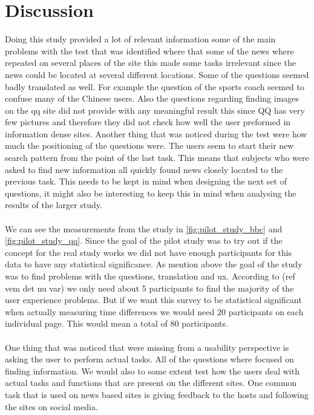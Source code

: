 \section{Discussion}
Doing this study provided a lot of relevant information some of the main problems with the test that was identified where that some of the news where repeated on several places of the site this made some tasks irrelevant since the news could be located at several different locations. Some of the questions seemed badly translated as well. For example the question of the sports coach seemed to confuse many of the Chinese users. Also the questions regarding finding images on the qq site did not provide with any meaningful result this since QQ has very few pictures and therefore they did not check how well the user preformed in information dense sites. Another thing that was noticed during the test were how much the positioning of the questions were. The users seem to start their new search pattern from the point of the last task. This means that subjects who were asked to find new information all quickly found news closely located to the previous task. This needs to be kept in mind when designing the next set of questions, it might also be interesting to keep this in mind when analysing the results of the larger study.
\\\\
We can see the measurements from the study in \ref{fig:pilot_study_bbc} and \ref{fig:pilot_study_qq}. Since the goal of the pilot study was to try out if the concept for the real study works we did not have enough participants for this data to have any statistical significance. As mention above the goal of the study was to find problems with the questions, translation and ux. According to (ref vem det nu var) we only need about 5 participants to find the majority of the user experience problems. But if we want this survey to be statistical significant when actually measuring time differences we would need 20 participants on each individual page. This would mean a total of 80 participants.
\\\\
One thing that was noticed that were missing from a usability perspective is asking the user to perform actual tasks. All of the questions where focused on finding information. We would also to some extent test how the users deal with actual tasks and functions that are present on the different sites. One common task that is used on news based sites is giving feedback to the hosts and following the sites on social media.

